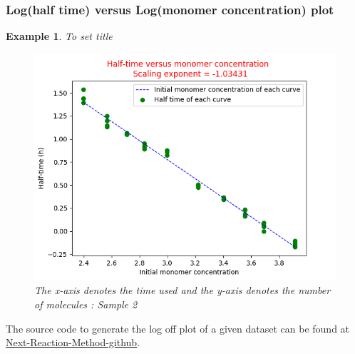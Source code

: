 \documentclass[11pt,a4paper]{article}
\newtheorem{example}[theorem]{Example}
\begin{document}
\subsubsection{Log(half time) versus Log(monomer concentration) plot}
\begin{example}{To set title}
  \begin{figure}[H]
  \centering
  \includegraphics[width=1\textwidth]{Images/half_time_vs_monomer.png}
  \caption{The x-axis denotes the time used and the y-axis denotes the number of molecules : Sample 2}
  \label{fig: sample trajectory}
  \end{figure}
\end{example}
The source code to generate the log off plot of a given dataset can be found at \href{https://github.com/Prateeba/TRAN-F501-Internship-201819/tree/master/Code/Fitting}{Next-Reaction-Method-github}.
\end{document}

